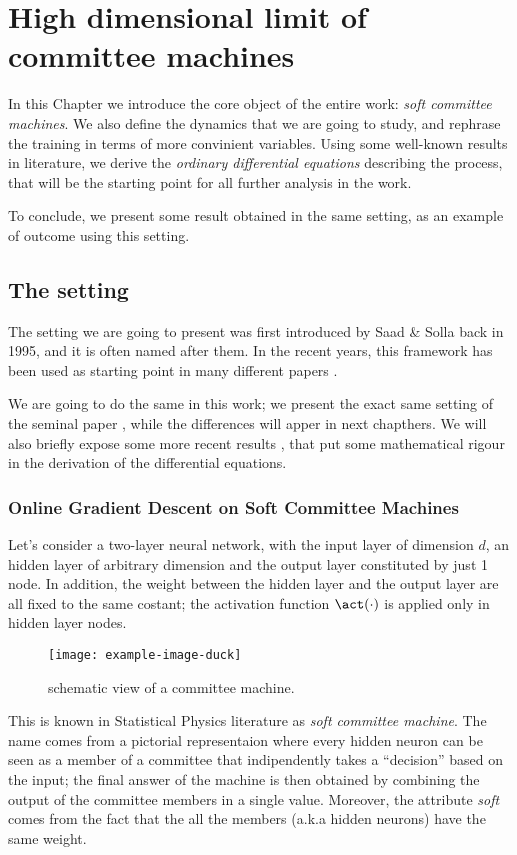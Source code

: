 \chapter{High dimensional limit of committee machines}
In this Chapter we introduce the core object of the entire work: \emph{soft committee machines}.
We also define the dynamics that we are going to study, and rephrase the training in terms
of more convinient variables. Using some well-known results in literature, we derive the 
\emph{ordinary differential equations} describing the process, that will be the starting point 
for all further analysis in the work.

To conclude, we present some result obtained in the same setting, as an example of 
outcome using this setting. %

\section{The setting}
The setting we are going to present was first introduced by Saad \& Solla \cite{saad1995line}
back in 1995,
and it is often named after them.
In the recent years, this framework has been used as starting point in many different papers
\cite{aubin2018committee, goldt2019dynamics,veiga2022phase}.

We are going to do the same in this work; we present the exact same setting of the seminal paper \cite{saad1995line}, while the differences
will apper in next chapthers. We will also briefly expose some more recent results \cite{goldt2019dynamics},
that put some mathematical rigour in the derivation of the differential equations.

\subsection{Online Gradient Descent on Soft Committee Machines}
Let's consider a two-layer neural network, with the input layer of dimension \(d\),
an hidden layer of arbitrary dimension and the output layer constituted by just 1 node.
In addition, the weight between the hidden layer and the output layer are all fixed 
to the same costant; the activation function \(\act(\cdot)\) is applied only in hidden layer nodes.
\begin{figure}
  \centering
  \texttt{[image: example-image-duck]}
  \caption{ schematic view of a committee machine.}
\end{figure}
This is known in Statistical Physics literature as \emph{soft
committee machine}. The name comes from a pictorial representaion where every hidden neuron can be seen 
as a member of a committee that indipendently takes a ``decision'' based on the input;
the final answer of the machine is then obtained by combining the output of the committee
members in a single value. Moreover, the attribute \emph{soft} comes from the fact
that the all the members (a.k.a hidden neurons) have the same weight.

